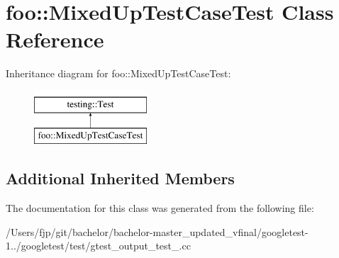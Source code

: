 \hypertarget{classfoo_1_1_mixed_up_test_case_test}{}\section{foo\+:\+:Mixed\+Up\+Test\+Case\+Test Class Reference}
\label{classfoo_1_1_mixed_up_test_case_test}
Inheritance diagram for foo\+:\+:Mixed\+Up\+Test\+Case\+Test\+:\begin{figure}[H]
\begin{center}
\leavevmode
\includegraphics[height=2.000000cm]{classfoo_1_1_mixed_up_test_case_test}
\end{center}
\end{figure}
\subsection*{Additional Inherited Members}


The documentation for this class was generated from the following file\+:\begin{DoxyCompactItemize}
\item 
/\+Users/fjp/git/bachelor/bachelor-\/master\+\_\+updated\+\_\+vfinal/googletest-\/1../googletest/test/gtest\+\_\+output\+\_\+test\+\_\+.\+cc\end{DoxyCompactItemize}
